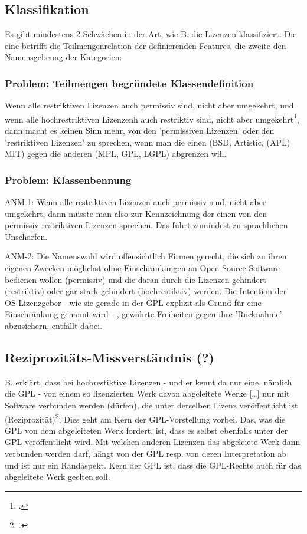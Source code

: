 \documentclass[DIV=calc,BCOR=5mm,11pt,headings=small,oneside,abstract=true, toc=bib]{scrartcl}
\begin{document}
\subsection{Klassifikation}

Es gibt mindestens 2 Schwächen in der Art, wie B. die Lizenzen klassifiziert.
Die eine betrifft die Teilmengenrelation der definierenden Features, die zweite
den Namensgebeung der Kategorien:

\subsubsection{Problem: Teilmengen begründete Klassendefinition}

Wenn alle restriktiven Lizenzen auch permissiv
sind, nicht aber umgekehrt, und wenn alle hochrestriktiven Lizenzenh auch
restriktiv sind, nicht aber umgekehrt\footcite[cf.][62]{Buchtala2007a},
dann macht es keinen Sinn mehr, von den 'permissiven Lizenzen' oder den
'restriktiven Lizenzen' zu sprechen, wenn man die einen (BSD, Artistic, (APL)
MIT) gegen die anderen (MPL, GPL, LGPL) abgrenzen will.

\subsubsection{Problem: Klassenbennung}

ANM-1: Wenn alle restriktiven Lizenzen auch permissiv sind, nicht aber
umgekehrt, dann müsste man also zur Kennzeichnung der einen von den
permissiv-restriktiven Lizenzen sprechen. Das führt zumindest zu sprachlichen
Unschärfen.

ANM-2: Die Namenswahl wird offensichtlich Firmen gerecht, die sich zu ihren
eigenen Zwecken möglichst ohne Einschränkungen an Open Source Software bedienen
wollen (permissiv) und die daran durch die Lizenzen gehindert (restriktiv) oder
gar stark gehindert (hochrestiktiv) werden.  Die Intention der OS-Lizenzgeber -
wie sie gerade in der GPL explizit als Grund für eine Einschränkung genannt wird
- , gewährte Freiheiten gegen ihre 'Rücknahme' abzusichern, entfällt dabei.

\subsection{Reziprozitäts-Missverständnis (?)}

B. erklärt, dass bei \glqq{}hochrestiktive Lizenzen\grqq{} - und er kennt da nur
eine, nämlich die GPL - von einem so lizenzierten Werk davon \glqq{}abgeleitete
Werke [\ldots] nur mit Software verbunden werden (dürfen), die unter derselben
Lizenz veröffentlicht ist
(Reziprozität)\grqq{}\footcite[cf.][62]{Buchtala2007a}. Dies geht am Kern der
GPL-Vorstellung vorbei. Das, was die GPL von dem abgeleiteten Werk fordert, ist,
dass es selbst ebenfalls unter der GPL veröffentlicht wird. Mit welchen anderen
Lizenzen das abgeleiete Werk dann verbunden werden darf, hängt von der GPL resp.
von deren Interpretation ab und ist nur ein Randaspekt. Kern der GPL ist, dass
die GPL-Rechte auch für das abgeleitete Werk geelten soll.

\small

\end{document}
